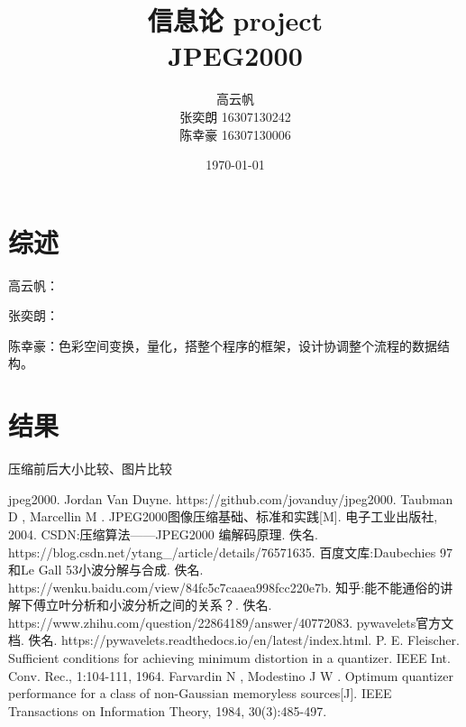 \documentclass{fduthesis}
\title{信息论 project\\JPEG2000}
\author{高云帆\\张奕朗 16307130242\\陈幸豪 16307130006}
\date{\today}
\begin{document}
\maketitle

\section{综述}


高云帆：\par
张奕朗：\par
陈幸豪：色彩空间变换，量化，搭整个程序的框架，设计协调整个流程的数据结构。










%

\section{结果}
压缩前后大小比较、图片比较

\begin{thebibliography}{1}
 jpeg2000. Jordan Van Duyne. https://github.com/jovanduy/jpeg2000.
 Taubman D , Marcellin M . JPEG2000图像压缩基础、标准和实践[M]. 电子工业出版社, 2004.
 CSDN:压缩算法——JPEG2000 编解码原理. 佚名. https://blog.csdn.net/ytang\_/article/details/76571635.
 百度文库:Daubechies 97和Le Gall 53小波分解与合成. 佚名. https://wenku.baidu.com/view/84fc5c7caaea998fcc220e7b.
 知乎:能不能通俗的讲解下傅立叶分析和小波分析之间的关系？. 佚名. https://www.zhihu.com/question/22864189/answer/40772083.
 pywavelets官方文档. 佚名. https://pywavelets.readthedocs.io/en/latest/index.html.
 P. E. Fleischer.  Sufficient  conditions for achieving minimum  distortion in a quantizer. IEEE Int. Conv. Rec., 1:104-111, 1964. 
Farvardin N , Modestino J W . Optimum quantizer performance for a class of non-Gaussian memoryless sources[J]. IEEE Transactions on Information Theory, 1984, 30(3):485-497.
\end{thebibliography}
\end{document}
